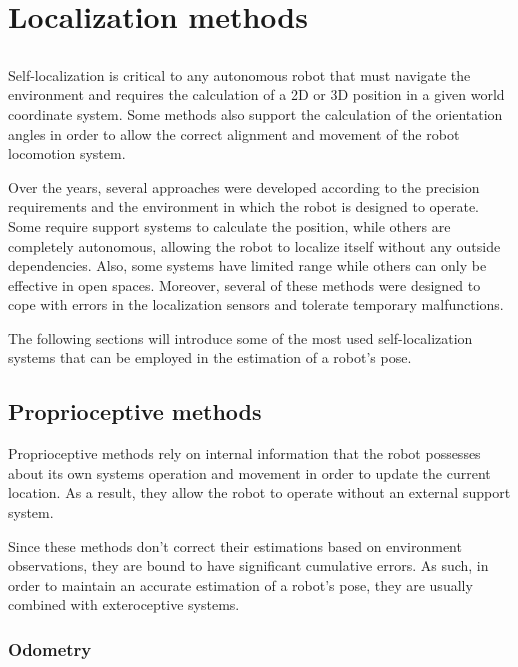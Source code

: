 \chapter{Localization methods}\label{chap:localization-methods}



\section*{}

Self-localization is critical to any autonomous robot that must navigate the environment and requires the calculation of a 2D or 3D position in a given world coordinate system. Some methods also support the calculation of the orientation angles in order to allow the correct alignment and movement of the robot locomotion system.

Over the years, several approaches were developed according to the precision requirements and the environment in which the robot is designed to operate. Some require support systems to calculate the position, while others are completely autonomous, allowing the robot to localize itself without any outside dependencies. Also, some systems have limited range while others can only be effective in open spaces. Moreover, several of these methods were designed to cope with errors in the localization sensors and tolerate temporary malfunctions.

The following sections will introduce some of the most used self-localization systems that can be employed in the estimation of a robot's pose.



\section{Proprioceptive methods}

Proprioceptive methods rely on internal information that the robot possesses about its own systems operation and movement in order to update the current location. As a result, they allow the robot to operate without an external support system.

Since these methods don't correct their estimations based on environment observations, they are bound to have significant cumulative errors. As such, in order to maintain an accurate estimation of a robot's pose, they are usually combined with exteroceptive systems.


\subsection{Odometry}

